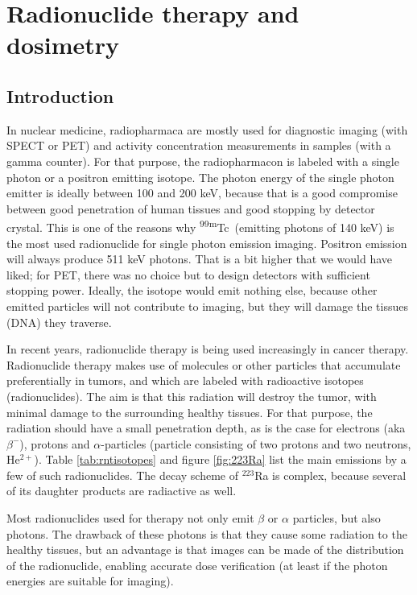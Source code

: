 \chapter{Radionuclide therapy and dosimetry}

\section{Introduction}
In nuclear medicine, radiopharmaca are mostly used for diagnostic
imaging (with SPECT or PET) and activity concentration measurements in
samples (with a gamma counter). For that purpose, the radiopharmacon is
labeled with a single photon or a positron emitting isotope. The
photon energy of the single photon emitter is ideally between 100 and
200 keV, because that is a good compromise between good penetration of
human tissues and good stopping by detector crystal. This is one of
the reasons why \textsuperscript{99m}Tc\ (emitting photons of 140 keV) is the most used
radionuclide for single photon emission imaging. Positron emission will
always produce 511 keV photons. That is a bit higher that we would
have liked; for PET, there was no choice but to design detectors with
sufficient stopping power. Ideally, the isotope would emit nothing
else, because other emitted particles will not contribute to imaging,
but they will damage the tissues (DNA) they traverse.

In recent years, radionuclide therapy is being used increasingly in
cancer therapy. Radionuclide therapy makes use of molecules or other
particles that accumulate preferentially in tumors, and which are
labeled with radioactive isotopes (radionuclides). The aim is that
this radiation will destroy the tumor, with minimal damage to the
surrounding healthy tissues. For that purpose, the radiation should
have a small penetration depth, as is the case for electrons (aka
$\beta^-$), protons and $\alpha$-particles (particle consisting of two
protons and two neutrons, He$^{2+}$). Table \ref{tab:rntisotopes} and
figure \ref{fig:223Ra} list the main emissions by a few of such
radionuclides. The decay scheme of $^{223}$Ra is complex, because several
of its daughter products are radiactive as well.

Most radionuclides used for therapy not only emit $\beta$ or $\alpha$
particles, but also photons. The drawback of these photons is that
they cause some radiation to the healthy tissues, but an advantage is
that images can be made of the distribution of the radionuclide,
enabling accurate dose verification (at least if the photon energies
are suitable for imaging).

